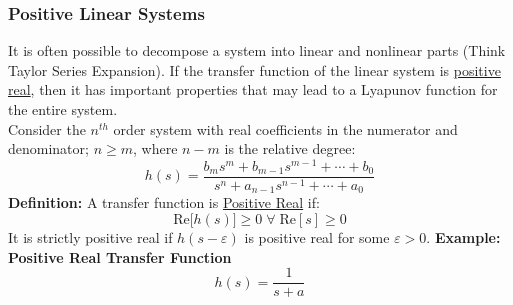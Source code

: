 \documentclass[11pt,handout]{beamer}   %
\begin{document}
\begin{frame}
\frametitle{Positive Linear Systems}
\small
It is often possible to decompose a system into linear and nonlinear parts (Think Taylor Series Expansion). If the transfer function of the linear system is \underline{positive real}, then it has important properties that may lead to a Lyapunov function for the entire system.\\
\vspace{6pt}
Consider the $n^{th}$ order system with real coefficients in the numerator and denominator; $n \geq m$, where $n-m$ is the relative degree:
\begin{equation*}
h(s) = \frac{b_m s^m + b_{m-1}s^{m-1} + \cdots + b_0}{s^n + a_{n-1}s^{n-1} + \cdots + a_0}
\end{equation*}
\textbf{Definition:} A transfer function is \underline{Positive Real} if:
\begin{equation*}
\textrm{Re[} h(s)\text{]} \geq 0 \; \forall \; \text{Re}[s] \geq 0
\end{equation*}
It is strictly positive real if $h(s - \varepsilon)$ is positive real for some $\varepsilon >0$.
\textbf{Example: Positive Real Transfer Function}\\
\begin{equation*}
h(s) = \frac{1}{s+a}
\end{equation*}
\end{frame}
\end{document}
